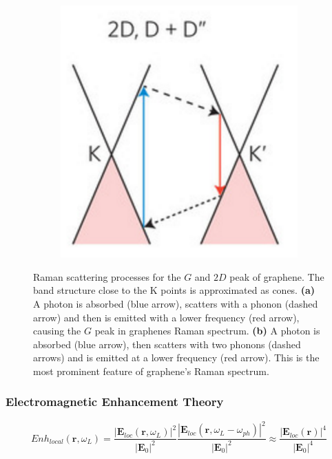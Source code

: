\begin{figure}[!h]
\begin{subfigure}{0.2\textwidth}
  \end{subfigure}
  ~
  \begin{subfigure}{0.45\textwidth}
    \includegraphics[width=\textwidth]{./images/2d-mode.png}
  \end{subfigure}
  \caption{Raman scattering processes for the $G$ and $2D$ peak of graphene. The band structure close to the K points is approximated as cones. \textbf{(a)} A photon is absorbed (blue arrow), scatters with a phonon (dashed arrow) and then is emitted with a lower frequency (red arrow), causing the $G$ peak in graphenes Raman spectrum. \textbf{(b)} A photon is absorbed (blue arrow), then scatters with two phonons (dashed arrows) and is emitted at a lower frequency (red arrow). This is the most prominent feature of graphene's Raman spectrum. }
\end{figure}

\null\newpage
\null\newpage

\subsubsection{Electromagnetic Enhancement Theory}

$$Enh_{local}(\mathbf{r},\omega_L)=\frac{\left|\mathbf{E}_{loc}(\mathbf{r}, \omega_L)\right|^2}{\left|\mathbf{E}_0\right|^2}\frac{\left|\mathbf{E}_{loc}(\mathbf{r}, \omega_L-\omega_{ph})\right|^2}{\left|\mathbf{E}_0\right|^2}\approx\frac{\left|\mathbf{E}_{loc}(\mathbf{r})\right|^4}{\left|\mathbf{E}_0\right|^4}$$

